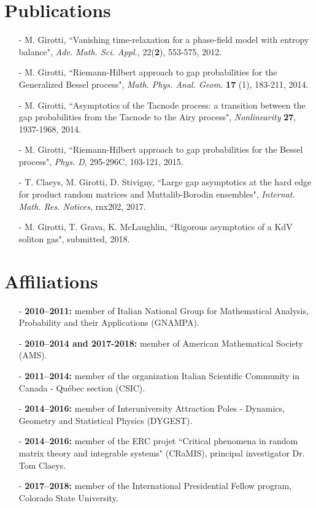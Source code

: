 \documentclass[margin]{res}
\begin{document}
\begin{resume}
   \section{Publications}
 \begin{itemize} \itemsep -2pt  %
 \item[-] M. Girotti, ``Vanishing time-relaxation for a phase-field model with entropy balance", \emph{Adv. Math. Sci. Appl.}, 22(\textbf{2}), 553-575, 2012. 
\item[-] M. Girotti, ``Riemann-Hilbert approach to gap probabilities for the Generalized Bessel process", \emph{Math. Phys. Anal. Geom.} \textbf{17} (1), 183-211, 2014.
\item[-] M. Girotti, ``Asymptotics of the Tacnode process: a transition between the gap probabilities from the Tacnode to the Airy process", \emph{Nonlinearity} \textbf{27}, 1937-1968, 2014.
\item[-] M. Girotti, ``Riemann-Hilbert approach to gap probabilities for the Bessel process", \emph{Phys. D}, 295-296C, 103-121, 2015.
\item[-] T. Claeys, M. Girotti, D. Stivigny, ``Large gap asymptotics at the hard edge for product random matrices and Muttalib-Borodin ensembles", \emph{Internat. Math. Res. Notices}, rnx202, 2017. 
\item[-] M. Girotti, T. Grava, K. McLaughlin, ``Rigorous asymptotics of a KdV soliton gas", submitted, 2018.\\
 \end{itemize}

 
 \section{Affiliations}
 \begin{itemize} \itemsep -2pt  %
\item[-] {\bf 2010--2011:} member of Italian National Group for Mathematical Analysis, Probability and their Applications (GNAMPA). 
\item[-] {\bf 2010--2014 and 2017-2018:} member of American Mathematical Society (AMS).
\item[-] {\bf 2011--2014:} member of the organization Italian Scientific Community in Canada - Qu\'ebec section (CSIC).
 \item[-] {\bf 2014--2016:} member of Interuniversity Attraction Poles - Dynamics, Geometry and Statistical Physics (DYGEST).
 \item[-] {\bf 2014--2016:} member of the ERC projet ``Critical phenomena in random matrix theory and integrable systems" (CRaMIS), principal investigator Dr. Tom Claeys. 
 \item[-] {\bf 2017--2018:} member of the International Presidential Fellow program, Colorado State University.\\
 \end{itemize}
 

\end{resume}
\end{document}
